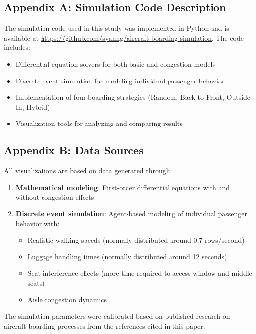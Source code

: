 \documentclass[12pt,a4paper]{article}
\begin{document}
\subsection{Appendix A: Simulation Code Description}
The simulation code used in this study was implemented in Python and is available at \url{https://github.com/syanhg/aircraft-boarding-simulation}. The code includes:

\begin{itemize}
    \item Differential equation solvers for both basic and congestion models
    \item Discrete event simulation for modeling individual passenger behavior
    \item Implementation of four boarding strategies (Random, Back-to-Front, Outside-In, Hybrid)
    \item Visualization tools for analyzing and comparing results
\end{itemize}

\subsection{Appendix B: Data Sources}
All visualizations are based on data generated through:

\begin{enumerate}
    \item \textbf{Mathematical modeling}: First-order differential equations with and without congestion effects
    \item \textbf{Discrete event simulation}: Agent-based modeling of individual passenger behavior with:
    \begin{itemize}
        \item Realistic walking speeds (normally distributed around 0.7 rows/second)
        \item Luggage handling times (normally distributed around 12 seconds)
        \item Seat interference effects (more time required to access window and middle seats)
        \item Aisle congestion dynamics
    \end{itemize}
\end{enumerate}

The simulation parameters were calibrated based on published research on aircraft boarding processes from the references cited in this paper.
\end{document}
